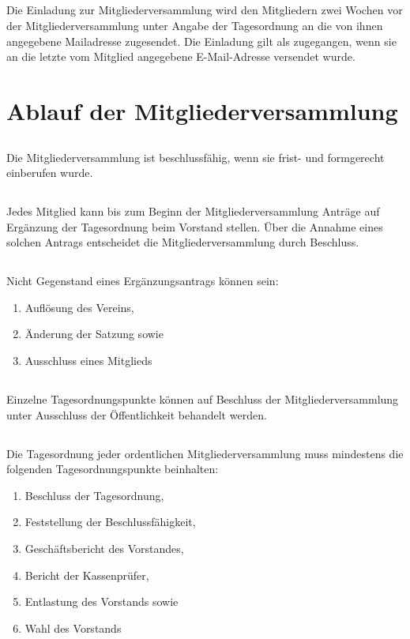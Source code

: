 \documentclass[12pt]{article}
\begin{document}
\subsection{}
Die Einladung zur Mitgliederversammlung wird den Mitgliedern zwei Wochen vor der Mitgliederversammlung unter Angabe der Tagesordnung an die von ihnen angegebene Mailadresse zugesendet. Die Einladung gilt als zugegangen, wenn sie an die letzte vom Mitglied angegebene E-Mail-Adresse versendet wurde.

\section{Ablauf der Mitgliederversammlung}
\label{to_mv}
\subsection{}
Die Mitgliederversammlung ist beschlussfähig, wenn sie frist- und formgerecht einberufen wurde.
\subsection{}
Jedes Mitglied kann bis zum Beginn der Mitgliederversammlung Anträge auf Ergänzung der Tagesordnung beim Vorstand stellen. Über die Annahme eines solchen Antrags entscheidet die Mitgliederversammlung durch Beschluss.
\subsection{}
Nicht Gegenstand eines Ergänzungsantrags können sein:
\begin{enumerate}
    \item Auflösung des Vereins,
    \item Änderung der Satzung sowie
    \item Ausschluss eines Mitglieds
\end{enumerate}
\subsection{}
Einzelne Tagesordnungspunkte können auf Beschluss der Mitgliederversammlung unter Ausschluss der Öffentlichkeit behandelt werden.
\subsection{}
\label{to_mv:to}
Die Tagesordnung jeder ordentlichen Mitgliederversammlung muss mindestens die folgenden Tagesordnungspunkte beinhalten:
\begin{enumerate}
    \item Beschluss der Tagesordnung,
    \item Feststellung der Beschlussfähigkeit,
    \item Geschäftsbericht des Vorstandes,
    \item Bericht der Kassenprüfer, 
    \item Entlastung des Vorstands sowie
    \item Wahl des Vorstands
\end{enumerate}
\end{document}

